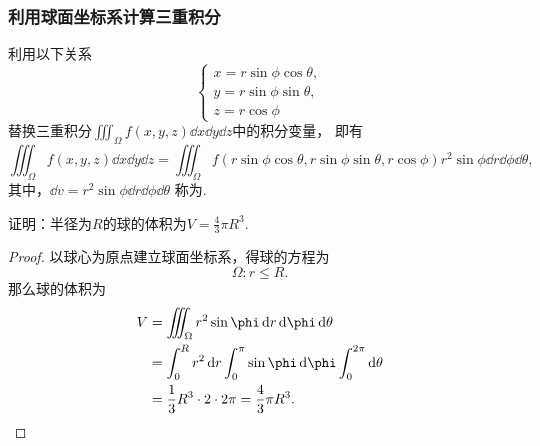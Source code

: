 \subsubsection{利用球面坐标系计算三重积分}
利用以下关系\[
	\left\{ \begin{array}{l}
		x = r \sin\phi \cos\theta, \\
		y = r \sin\phi \sin\theta, \\
		z = r \cos\phi
	\end{array} \right.
\]替换三重积分\(\iiint_\Omega{f(x,y,z)\dd{x}\dd{y}\dd{z}}\)中的积分变量，
即有\[
	\iiint_\Omega{f(x,y,z)\dd{x}\dd{y}\dd{z}}
	= \iiint_\Omega{f(r \sin\phi \cos\theta,r \sin\phi \sin\theta,r \cos\phi) r^2 \sin\phi \dd{r} \dd{\phi} \dd{\theta}},
\]
其中，\(\dd{v} = r^2 \sin\phi \dd{r} \dd{\phi} \dd{\theta}\)
称为.

\begin{example}
证明：半径为\(R\)的球的体积为\(V = \frac{4}{3} \pi R^3\).
\begin{proof}
以球心为原点建立球面坐标系，得球的方程为\[
	\Omega: r \leq R.
\]
那么球的体积为\begin{align*}
	V &= \iiint_\Omega r^2 \sin\phi \dd{r} \dd{\phi} \dd{\theta} \\
	&= \int_0^R r^2 \dd{r} \int_0^\pi \sin\phi \dd{\phi} \int_0^{2\pi} \dd{\theta} \\
	&= \frac{1}{3} R^3 \cdot 2 \cdot 2\pi
	= \frac{4}{3} \pi R^3.
	\qedhere
\end{align*}
\end{proof}
\end{example}

